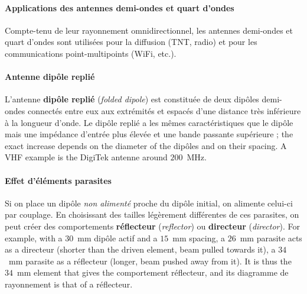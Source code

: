 \begin{figure}[h!]
  \centering
\end{figure}

\paragraph{Applications des antennes demi-ondes et quart d'ondes} Compte-tenu
de leur rayonnement omnidirectionnel, les antennes demi-ondes et quart d'ondes
sont utilisées pour la diffusion (TNT, radio) et pour les communications
point-multipoints (WiFi, etc.).

\paragraph{Antenne dipôle replié} L'antenne \textbf{dipôle replié}
(\textit{folded dipole}) est constituée de deux dipôles demi-ondes connectés
entre eux aux extrémités et espacés d'une distance très inférieure à la
longueur d'onde. Le dipôle replié a les mêmes caractéristiques que le dipôle
mais une impédance d'entrée plus élevée et une bande passante supérieure ; the
exact increase depends on the diameter of the dipôles and on their spacing. A
VHF example is the DigiTek antenne around $200$~MHz.

\paragraph{Effet d'éléments parasites} Si on place un dipôle \emph{non
alimenté} proche du dipôle initial, on alimente celui-ci par couplage. En
choisissant des tailles légèrement différentes de ces parasites, on peut créer
des comportements \textbf{réflecteur} (\textit{reflector}) ou
\textbf{directeur} (\textit{director}). For example, with a $30$~mm dipôle
actif and a $15$~mm spacing, a $26$~mm parasite acts as a directeur (shorter
than the driven element, beam pulled towards it), a $34$~mm parasite as a
réflecteur (longer, beam pushed away from it). It is thus the $34$~mm element
that gives the comportement réflecteur, and its diagramme de rayonnement is
that of a réflecteur.

